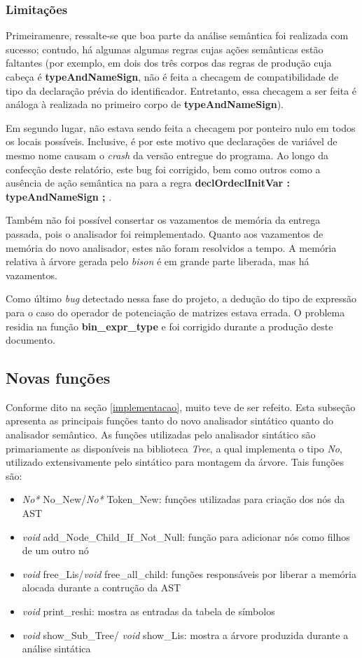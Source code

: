 \documentclass[
	article,			%
	11pt,				%
	oneside,			%
	a4paper,			%
	english,			%
	brazil,				%
	sumario=tradicional
	]{abntex2}
\renewcommand{\it}[1]{\textit{#1}}
\renewcommand{\bf}[1]{\textbf{#1}}
\begin{document}
\subsubsection{Limitações}

Primeiramenre, ressalte-se que boa parte da análise semântica foi realizada com sucesso; contudo, há algumas algumas regras cujas ações semânticas estão faltantes (por exemplo, em dois dos três corpos das regras de produção cuja cabeça é \bf{typeAndNameSign}, não é feita a checagem de compatibilidade de tipo da declaração prévia do identificador. Entretanto, essa checagem a ser feita é análoga à realizada no primeiro corpo de \bf{typeAndNameSign}).

Em segundo lugar, não estava sendo feita a checagem por ponteiro nulo em todos os locais possíveis. Inclusive, é por este motivo que declarações de variável de mesmo nome causam o \it{crash} da versão entregue do programa. Ao longo da confecção deste relatório, este bug foi corrigido, bem como outros como a ausência de ação semântica na para a regra \bf{declOrdeclInitVar : typeAndNameSign ;} .

Também não foi possível consertar os vazamentos de memória da entrega passada, pois o analisador foi reimplementado. Quanto aos vazamentos de memória do novo analisador, estes não foram resolvidos a tempo. A memória relativa à árvore gerada pelo \it{bison} é em grande parte liberada, mas há vazamentos.

Como último \it{bug} detectado nessa fase do projeto, a dedução do tipo de expressão para o caso do operador de potenciação de matrizes estava errada. O problema residia na função \bf{bin\_expr\_type} e foi corrigido durante a produção deste documento.

\subsection{Novas funções}

Conforme dito na seção \ref{implementacao}, muito teve de ser refeito. Esta subseção apresenta as principais funções tanto do novo analisador sintático quanto do analisador semântico. As funções utilizadas pelo analisador sintático são primariamente as disponíveis na biblioteca \it{Tree}, a qual implementa o tipo \it{No}, utilizado extensivamente pelo sintático para montagem da árvore. Tais funções são:
\begin{itemize}
	\item \it{No*} No\_New/\it{No*} Token\_New: funções utilizadas para criação dos nós da AST
	\item \it{void} add\_Node\_Child\_If\_Not\_Null: função para adicionar nós como filhos de um outro nó
	\item \it{void} free\_Lis/\it{void} free\_all\_child: funções responsáveis por liberar a memória alocada  durante a contrução da AST
	\item \it{void} print\_reshi: mostra as entradas da tabela de símbolos
	\item \it{void} show\_Sub\_Tree/ \it{void} show\_Lis: mostra a árvore produzida durante a análise sintática
\end{itemize}
\end{document}

